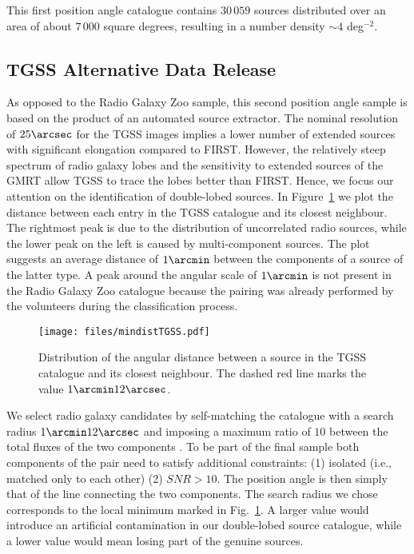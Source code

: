             This first position angle catalogue contains $30\,059$ sources distributed over an area of about $7\,000$ square degrees, resulting in a number density $\sim4$ deg$^{-2}$.


		\subsection{TGSS Alternative Data Release}
		
			As opposed to the Radio Galaxy Zoo sample, this second position angle sample is based on the product of an automated source extractor. The nominal resolution of $25\arcsec$ for the TGSS images implies a lower number of extended sources with significant elongation compared to FIRST. However, the relatively steep spectrum of radio galaxy lobes and the sensitivity to extended sources of the GMRT allow TGSS to trace the lobes better than FIRST.  Hence, we focus our attention on the identification of double-lobed sources. 
			In Figure~\ref{fig:mindistTGSS} we plot the distance between each entry in the TGSS catalogue and its closest neighbour. The rightmost peak is due to the distribution of uncorrelated radio sources, while the lower peak on the left is caused by multi-component sources. The plot suggests an average distance of $1\arcmin$ between the components of a source of the latter type. A peak around the angular scale of $1\arcmin$ is not present in the Radio Galaxy Zoo catalogue because the pairing was already performed by the volunteers during the classification process.

			\begin{figure}
				\centering
				\texttt{[image: files/mindistTGSS.pdf]}
				\caption{Distribution of the angular distance between a source in the TGSS catalogue and its closest neighbour. The dashed red line marks the value $1\arcmin12\arcsec$.}
				
				\label{fig:mindistTGSS}
			\end{figure}
			
			We select radio galaxy candidates by self-matching the catalogue with a search radius $1\arcmin12\arcsec$ and imposing a maximum ratio of $10$ between the total fluxes of the two components \citep{VanVelzen2014}.
			To be part of the final sample both components of the pair need to satisfy additional constraints: (1) isolated (i.e., matched only to each other) (2) $SNR>10$. The position angle is then simply that of the line connecting the two components. The search radius we chose corresponds to the local minimum marked in Fig.~\ref{fig:mindistTGSS}. A larger value would introduce an artificial contamination in our double-lobed source catalogue, while a lower value would mean losing part of the genuine sources.
			

